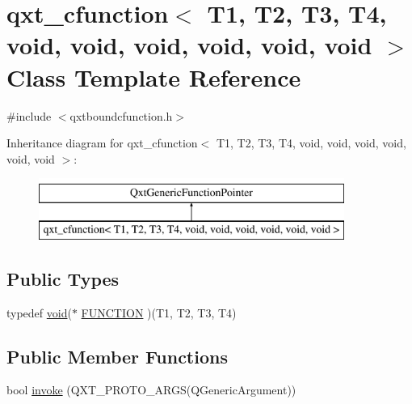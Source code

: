 \hypertarget{classqxt__cfunction_3_01_t1_00_01_t2_00_01_t3_00_01_t4_00_01void_00_01void_00_01void_00_01void_00_01void_00_01void_01_4}{\section{qxt\-\_\-cfunction$<$ T1, T2, T3, T4, void, void, void, void, void, void $>$ Class Template Reference}
\label{classqxt__cfunction_3_01_t1_00_01_t2_00_01_t3_00_01_t4_00_01void_00_01void_00_01void_00_01void_00_01void_00_01void_01_4}
}


{\ttfamily \#include $<$qxtboundcfunction.\-h$>$}

Inheritance diagram for qxt\-\_\-cfunction$<$ T1, T2, T3, T4, void, void, void, void, void, void $>$\-:\begin{figure}[H]
\begin{center}
\leavevmode
\includegraphics[height=2.000000cm]{classqxt__cfunction_3_01_t1_00_01_t2_00_01_t3_00_01_t4_00_01void_00_01void_00_01void_00_01void_00_01void_00_01void_01_4}
\end{center}
\end{figure}
\subsection*{Public Types}
\begin{DoxyCompactItemize}
\item 
typedef \hyperlink{group___u_a_v_objects_plugin_ga444cf2ff3f0ecbe028adce838d373f5c}{void}($\ast$ \hyperlink{classqxt__cfunction_3_01_t1_00_01_t2_00_01_t3_00_01_t4_00_01void_00_01void_00_01void_00_01void_00_01void_00_01void_01_4_a81a174b3e027dfc2c4222dabd9725b31}{F\-U\-N\-C\-T\-I\-O\-N} )(T1, T2, T3, T4)
\end{DoxyCompactItemize}
\subsection*{Public Member Functions}
\begin{DoxyCompactItemize}
\item 
bool \hyperlink{classqxt__cfunction_3_01_t1_00_01_t2_00_01_t3_00_01_t4_00_01void_00_01void_00_01void_00_01void_00_01void_00_01void_01_4_aafce8d80e9dc3e7f8588f0ae026ded94}{invoke} (Q\-X\-T\-\_\-\-P\-R\-O\-T\-O\-\_\-A\-R\-G\-S(Q\-Generic\-Argument))
\end{DoxyCompactItemize}

